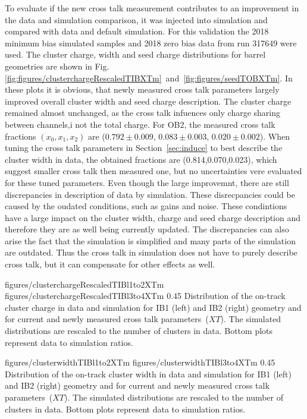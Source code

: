 To evaluate if the new cross talk measurement contributes to an improvement in the data and simulation comparison, it was injected into simulation and compared with data and default simulation. For this validation the 2018 minimum bias simulated samples and 2018 zero bias data from run 317649 were used. The cluster charge, width and seed charge distributions for barrel geometries are shown in Fig.\ref{fig:figures/clusterchargeRescaledTIBXTm}~and~\ref{fig:figures/seedTOBXTm}. In these plots it is obvious, that newly measured cross talk parameters largely improved overall cluster width and seed charge description. The cluster charge remained almost unchanged, as the cross talk infuences only charge sharing between channels,i not the total charge.  For OB2, the measured cross talk fractions $(x_{0}, x_{1}, x_{2})$ are ($0.792 \pm 0.009 $, $0.083 \pm 0.003 $, $0.020 \pm 0.002$). When tuning the cross talk parameters in Section~\ref{sec:induce} to best describe the cluster width in data, the obtained fractions are (0.814,0.070,0.023), which suggest smaller cross talk then measured one, but no uncertainties vere evaluated for these tuned parameters. Even though the large improvemnt, there are still discrepancies in description of data by simulation. These disrecpancies could be caused by the oudated conditions, such as gains and noise. These condintions have a large impact on the cluster width, charge and seed charge description and therefore they are as well being currently updated. The discrepancies can also arise the fact that the simulation is simplified and many parts of the simulation are outdated. Thus the cross talk in simulation does not have to purely describe cross talk, but it can compensate for other effects as well. 


                 {figures/clusterchargeRescaledTIBl1to2XTm} %
                 {figures/clusterchargeRescaledTIBl3to4XTm} %
                 {0.45}       %
                 { Distribution of the on-track cluster charge in data and simulation for IB1 (left) and IB2 (right) geometry and for current and newly measured cross talk parameters~($XT$).  The simulated distributions are rescaled to the number of clusters in data.  Bottom plots represent data to simulation ratios. }

                 {figures/clusterwidthTIBl1to2XTm}
                 {figures/clusterwidthTIBl3to4XTm}
                 {0.45}       %
                 { Distribution of the on-track cluster width in data and simulation for IB1 (left) and IB2 (right) geometry and for current and newly measured cross talk parameters~($XT$).  The simulated distributions are rescaled to the number of clusters in data.  Bottom plots represent data to simulation ratios. }

